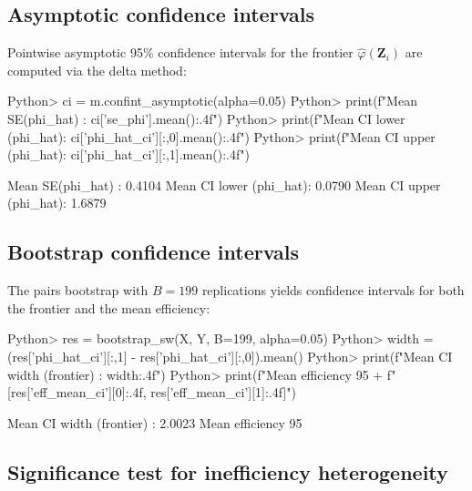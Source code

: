 \documentclass[article]{jss}
\begin{document}
\subsection{Asymptotic confidence intervals}
\label{sec:example-asym}

Pointwise asymptotic 95\% confidence intervals for the frontier
$\hat\varphi(\mathbf{Z}_i)$ are computed via the delta method:
%
\begin{CodeChunk}
\begin{CodeInput}
Python> ci = m.confint_asymptotic(alpha=0.05)
Python> print(f"Mean SE(phi_hat)       : {ci['se_phi'].mean():.4f}")
Python> print(f"Mean CI lower (phi_hat): {ci['phi_hat_ci'][:,0].mean():.4f}")
Python> print(f"Mean CI upper (phi_hat): {ci['phi_hat_ci'][:,1].mean():.4f}")
\end{CodeInput}
\begin{CodeOutput}
Mean SE(phi_hat)       : 0.4104
Mean CI lower (phi_hat): 0.0790
Mean CI upper (phi_hat): 1.6879
\end{CodeOutput}
\end{CodeChunk}

\subsection{Bootstrap confidence intervals}
\label{sec:example-boot}

The pairs bootstrap with $B = 199$ replications yields confidence
intervals for both the frontier and the mean efficiency:
%
\begin{CodeChunk}
\begin{CodeInput}
Python> res = bootstrap_sw(X, Y, B=199, alpha=0.05)
Python> width = (res['phi_hat_ci'][:,1] - res['phi_hat_ci'][:,0]).mean()
Python> print(f"Mean CI width (frontier)     : {width:.4f}")
Python> print(f"Mean efficiency 95%
+             f"[{res['eff_mean_ci'][0]:.4f}, {res['eff_mean_ci'][1]:.4f}]")
\end{CodeInput}
\begin{CodeOutput}
Mean CI width (frontier)     : 2.0023
Mean efficiency 95%
\end{CodeOutput}
\end{CodeChunk}

\subsection{Significance test for inefficiency heterogeneity}
\label{sec:example-test}
\end{document}
